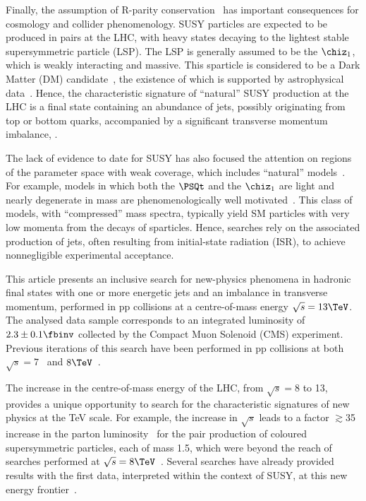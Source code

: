 Finally, the assumption of R-parity conservation~\cite{Farrar:1978xj}
has important consequences for cosmology and collider
phenomenology. SUSY particles are expected to be produced in pairs at
the LHC, with heavy states decaying to the lightest stable
supersymmetric particle (LSP). The LSP is generally assumed to be the
$\chiz_1$, which is weakly interacting and massive. This sparticle is
considered to be a Dark Matter (DM) candidate~\cite{Jungman:1995df},
the existence of which is supported by astrophysical
data~\cite{1674-1137-38-9-090001}.  Hence, the characteristic
signature of ``natural'' SUSY production at the LHC is a final state
containing an abundance of jets, possibly originating from top or
bottom quarks, accompanied by a significant transverse momentum
imbalance, \ptvecmiss.

The lack of evidence to date for SUSY has also focused the attention
on regions of the parameter space with weak coverage, which includes
``natural'' models~\cite{Delgado:2012eu, Boehm:1999tr, Carena:2008mj,
  Grober:2014aha, Grober:2015fia}. For example, models in which both
the $\PSQt$ and the $\chiz_1$ are light and nearly degenerate in mass
are phenomenologically well motivated~\cite{Boehm:1999bj,
  Balazs:2004bu, Martin:2007gf, Martin:2007hn}. This class of models,
with ``compressed'' mass spectra, typically yield SM particles with
very low momenta from the decays of sparticles. Hence, searches rely
on the associated production of jets, often resulting from
initial-state radiation (ISR), to achieve nonnegligible experimental
acceptance.

This article presents an inclusive search for new-physics phenomena in
hadronic final states with one or more energetic jets and an imbalance
in transverse momentum, performed in pp collisions at a centre-of-mass
energy $\sqrt{s} = 13\TeV$. The analysed data sample corresponds to an
integrated luminosity of $2.3 \pm 0.1 \fbinv$ %
collected by the Compact Muon Solenoid (CMS) experiment. Previous
iterations of this search have been performed in pp collisions at both
$\sqrt{s} = 7$~\cite{RA1Paper, RA1Paper2011, RA1Paper2011FULL} and
$8\TeV$~\cite{RA1Paper2012, RA1Parked}.

The increase in the centre-of-mass energy of the LHC, from $\sqrt{s} =
8$ to 13\TeV, provides a unique opportunity to search for the
characteristic signatures of new physics at the TeV scale. For
example, the increase in $\sqrt{s}$ leads to a factor $\gtrsim$35
increase in the parton luminosity~\cite{Martin:2010db} for the pair
production of coloured supersymmetric particles, each of mass 1.5\TeV,
which were beyond the reach of searches performed at $\sqrt{s} =
8\TeV$~\cite{Aad:2015iea, CMS:2014dpa, Khachatryan:2015vra}.  Several
searches have already provided results with the first data,
interpreted within the context of SUSY, at this new energy
frontier~\cite{atlas-12, atlas-13, cms-12, cms-13}.


